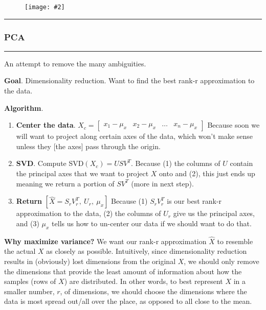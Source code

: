 \documentclass[12pt]{article}
\newcommand\myfig[2][0.3\textwidth]{\begin{figure}[h!]\centering\texttt{[image: \#2]}\end{figure}}
\newcommand{\myspace}{\vspace{2\bigskipamount}}
\newcommand\p{\Needspace{10\baselineskip} \noindent}
\begin{document}

\myfig{ActFuncs.PNG}

\myspace
{}
\hrule 
\subsubsection{PCA}
\hrule 

\p {} An attempt to remove the many ambiguities. 
\begin{compactitem}
	\item \textbf{Goal}. Dimensionality reduction. Want to find the best rank-r approximation to the data. 
	\item \textbf{Algorithm}. 
	\begin{enumerate}
		\item \textbf{Center the data}. $X_c = \begin{bmatrix}x_1 - \mu_x & x_2 - \mu_x & \ldots & x_n - \mu_x\end{bmatrix}$
		 Because soon we will want to project along certain axes of the data, which won't make sense unless they [the axes] pass through the origin.
		
		\item \textbf{SVD}. Compute SVD$(X_c) = U S V^T$.  Because (1) the columns of $U$ contain the principal axes that we want to project $X$ onto and (2), this just ends up meaning we return a portion of $SV^T$ (more in next step). 
		
		\item \textbf{Return} $[ \hat X = S_r V_r^T, ~ U_r, ~ \mu_x ]$  Because (1) $S_r V_r^T$ is our best rank-r approximation to the data, (2) the columns of $U_r$ give us the principal axes, and (3) $\mu_x$ tells us how to un-center our data if we should want to do that. 
	\end{enumerate}
	
	\item \textbf{Why maximize variance?} We want our rank-r approximation $\hat X$ to resemble the actual $X$ as closely as possible. Intuitively, since dimensionality reduction results in (obviously) lost dimensions from the original $X$, we should only remove the dimensions that provide the least amount of information about how the samples (rows of $X$) are distributed. In other words, to best represent $X$ in a smaller number, $r$, of dimensions, we should choose the dimensions where the data is most spread out/all over the place, as opposed to all close to the mean. 
	
\end{compactitem}
\end{document}
